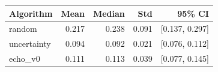 \begin{tabular}{lrrrr}
\hline
Algorithm & Mean & Median & Std & 95\% CI \\
\hline
random & 0.217 & 0.238 & 0.091 & [0.137, 0.297] \\
uncertainty & 0.094 & 0.092 & 0.021 & [0.076, 0.112] \\
echo\_v0 & 0.111 & 0.113 & 0.039 & [0.077, 0.145] \\
\hline
\end{tabular}
